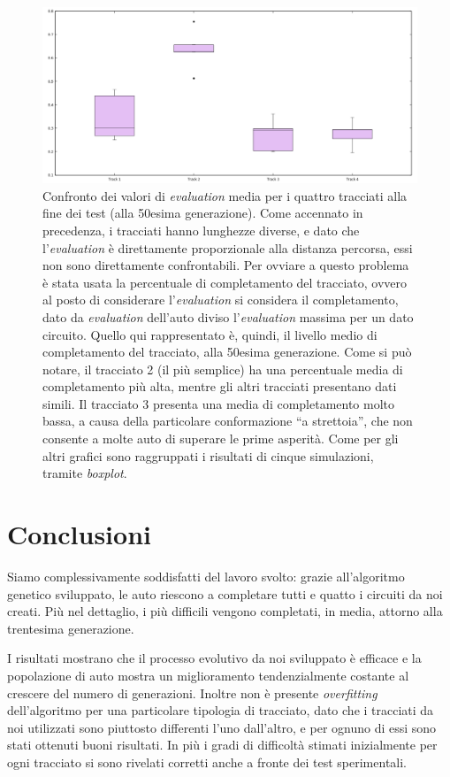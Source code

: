 \documentclass[a4paper,12pt]{article}
\begin{document}
\begin{figure}[H]
	\centering
	\includegraphics[width=130mm]{../results/avgEvAtTheEnd.png}
	\caption{Confronto dei valori di \emph{evaluation} media per i quattro tracciati alla fine dei test (alla 50esima generazione). Come accennato in precedenza, i tracciati hanno lunghezze diverse, e dato che l'\emph{evaluation} è direttamente proporzionale alla distanza percorsa, essi non sono direttamente confrontabili. Per ovviare a questo problema è stata usata la percentuale di completamento del tracciato, ovvero al posto di considerare l'\emph{evaluation} si considera il completamento, dato da \emph{evaluation} dell'auto diviso l'\emph{evaluation} massima per un dato circuito. Quello qui rappresentato è, quindi, il livello medio di completamento del tracciato, alla 50esima generazione. Come si può notare, il tracciato 2 (il più semplice) ha una percentuale media di completamento più alta, mentre gli altri tracciati presentano dati simili. Il tracciato 3 presenta una media di completamento molto bassa, a causa della particolare conformazione ``a strettoia'', che non consente a molte auto di superare le prime asperità. Come per gli altri grafici sono raggruppati i risultati di cinque simulazioni, tramite \emph{boxplot}.}
\end{figure}


\section{Conclusioni} \label{conclusions}

Siamo complessivamente soddisfatti del lavoro svolto: grazie all'algoritmo genetico sviluppato, le auto riescono a completare tutti e quatto i circuiti da noi creati. Più nel dettaglio, i più difficili vengono completati, in media, attorno alla trentesima generazione.

I risultati mostrano che il processo evolutivo da noi sviluppato è efficace e la popolazione di auto mostra un miglioramento tendenzialmente costante al crescere del numero di generazioni. Inoltre non è presente \emph{overfitting} dell'algoritmo per una particolare tipologia di tracciato, dato che i tracciati da noi utilizzati sono piuttosto differenti l'uno dall'altro, e per ognuno di essi sono stati ottenuti buoni risultati. In più i gradi di difficoltà stimati inizialmente per ogni tracciato si sono rivelati corretti anche a fronte dei test sperimentali. 
\end{document}
